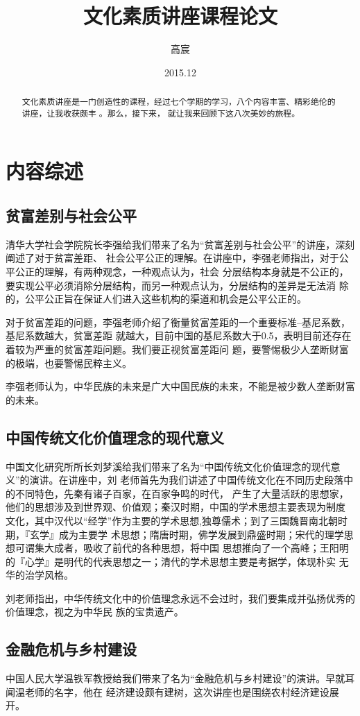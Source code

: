 \documentclass[a4paper]{cctart}
\title{文化素质讲座课程论文}
\author{高宸}
\date{2015.12}
\affil{电子工程系~无22班~2012011027}
\numberwithin{equation}{section} \pagestyle{fancy}
\begin{document}
\maketitle
\begin{abstract}
文化素质讲座是一门创造性的课程，经过七个学期的学习，八个内容丰富、精彩绝伦的讲座，让我收获颇丰
。那么，接下来，
就让我来回顾下这八次美妙的旅程。
\end{abstract}

\section{内容综述}\label{1}
\subsection{贫富差别与社会公平}
清华大学社会学院院长李强给我们带来了名为“贫富差别与社会公平”的讲座，深刻阐述了对于贫富差距、
社会公平公正的理解。在讲座中，李强老师指出，对于公平公正的理解，有两种观念，一种观点认为，社会
分层结构本身就是不公正的，要实现公平必须消除分层结构，而另一种观点认为，分层结构的差异是无法消
除的，公平公正旨在保证人们进入这些机构的渠道和机会是公平公正的。

对于贫富差距的问题，李强老师介绍了衡量贫富差距的一个重要标准--基尼系数，基尼系数越大，贫富差距
就越大，目前中国的基尼系数大于0.5，表明目前还存在着较为严重的贫富差距问题。我们要正视贫富差距问
题，要警惕极少人垄断财富的极端，也要警惕民粹主义。

李强老师认为，中华民族的未来是广大中国民族的未来，不能是被少数人垄断财富的未来。
\subsection{中国传统文化价值理念的现代意义}
中国文化研究所所长刘梦溪给我们带来了名为“中国传统文化价值理念的现代意义”的演讲。在讲座中，刘
老师首先为我们讲述了中国传统文化在不同历史段落中的不同特色，先秦有诸子百家，在百家争鸣的时代，
产生了大量活跃的思想家，他们的思想涉及到世界观、价值观；秦汉时期，中国的学术思想主要表现为制度
文化，其中汉代以“经学”作为主要的学术思想,独尊儒术；到了三国魏晋南北朝时期，『玄学』成为主要学
术思想；隋唐时期，佛学发展到鼎盛时期；宋代的理学思想可谓集大成者，吸收了前代的各种思想，将中国
思想推向了一个高峰；王阳明的『心学』是明代的代表思想之一；清代的学术思想主要是考据学，体现朴实
无华的治学风格。

刘老师指出，中华传统文化中的价值理念永远不会过时，我们要集成并弘扬优秀的价值理念，视之为中华民
族的宝贵遗产。

\subsection{金融危机与乡村建设}
中国人民大学温铁军教授给我们带来了名为“金融危机与乡村建设”的演讲。早就耳闻温老师的名字，他在
经济建设颇有建树，这次讲座也是围绕农村经济建设展开。
\end{document}
